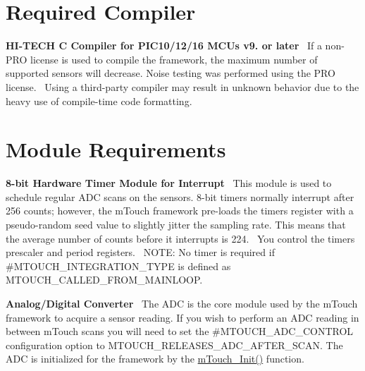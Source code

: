 \hypertarget{_resource_requirements_rrCompiler}{}\section{Required Compiler}\label{_resource_requirements_rrCompiler}
\begin{DoxyItemize}
\item {\bfseries H\+I-\/\+T\+E\+C\+H C Compiler for P\+I\+C10/12/16 M\+C\+Us v9. or later}~\newline
 If a non-\/\+P\+R\+O license is used to compile the framework, the maximum number of supported sensors will decrease. Noise testing was performed using the P\+R\+O license.~\newline
 Using a third-\/party compiler may result in unknown behavior due to the heavy use of compile-\/time code formatting.~\newline
\end{DoxyItemize}
\hypertarget{_resource_requirements_rrModules}{}\section{Module Requirements}\label{_resource_requirements_rrModules}
\begin{DoxyItemize}
\item {\bfseries 8-\/bit Hardware Timer Module for Interrupt}~\newline
 This module is used to schedule regular A\+D\+C scans on the sensors. 8-\/bit timers normally interrupt after 256 counts; however, the m\+Touch framework pre-\/loads the timer\textquotesingle{}s register with a pseudo-\/random seed value to slightly jitter the sampling rate. This means that the average number of counts before it interrupts is 224.~\newline
 You control the timer\textquotesingle{}s prescaler and period registers.~\newline
 N\+O\+T\+E\+: No timer is required if \#\+M\+T\+O\+U\+C\+H\+\_\+\+I\+N\+T\+E\+G\+R\+A\+T\+I\+O\+N\+\_\+\+T\+Y\+P\+E is defined as M\+T\+O\+U\+C\+H\+\_\+\+C\+A\+L\+L\+E\+D\+\_\+\+F\+R\+O\+M\+\_\+\+M\+A\+I\+N\+L\+O\+O\+P.\end{DoxyItemize}
\begin{DoxyItemize}
\item {\bfseries Analog/\+Digital Converter}~\newline
 The A\+D\+C is the core module used by the m\+Touch framework to acquire a sensor reading. If you wish to perform an A\+D\+C reading in between m\+Touch scans you will need to set the \#\+M\+T\+O\+U\+C\+H\+\_\+\+A\+D\+C\+\_\+\+C\+O\+N\+T\+R\+O\+L configuration option to M\+T\+O\+U\+C\+H\+\_\+\+R\+E\+L\+E\+A\+S\+E\+S\+\_\+\+A\+D\+C\+\_\+\+A\+F\+T\+E\+R\+\_\+\+S\+C\+A\+N. The A\+D\+C is initialized for the framework by the \hyperlink{m_touch_8c_ab73968cbb19d4ae25a65698c15906b65}{m\+Touch\+\_\+\+Init()} function.~\newline
\end{DoxyItemize}
